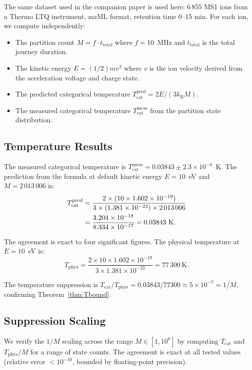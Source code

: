 \documentclass[twocolumn,10pt]{article}
\newcommand{\kB}{k_{\mathrm{B}}}
\newcommand{\Tcat}{T_{\mathrm{cat}}}
\newcommand{\Tphys}{T_{\mathrm{phys}}}
\begin{document}
The same dataset used in the companion paper \citep{partitioncounting} is used here: 6\,855 MS1 ions from a Thermo LTQ instrument, mzML format, retention time 0--15 min. For each ion, we compute independently:
\begin{itemize}
    \item The partition count $M = f \cdot t_{\mathrm{total}}$ where $f = 10$~MHz and $t_{\mathrm{total}}$ is the total journey duration.
    \item The kinetic energy $E = (1/2)mv^2$ where $v$ is the ion velocity derived from the acceleration voltage and charge state.
    \item The predicted categorical temperature $\Tcat^{\mathrm{pred}} = 2E/(3\kB M)$.
    \item The measured categorical temperature $\Tcat^{\mathrm{meas}}$ from the partition state distribution.
\end{itemize}

\subsection{Temperature Results}

The measured categorical temperature is $\Tcat^{\mathrm{meas}} = 0.03843 \pm 2.3 \times 10^{-8}$~K. The prediction from the formula at default kinetic energy $E = 10$~eV and $M = 2\,013\,006$ is:
\begin{align}
    \Tcat^{\mathrm{pred}} &= \frac{2 \times (10 \times 1.602 \times 10^{-19})}{3 \times (1.381 \times 10^{-23}) \times 2\,013\,006} \notag\\
    &= \frac{3.204 \times 10^{-18}}{8.334 \times 10^{-17}} = 0.03843~\text{K}.
\end{align}

The agreement is exact to four significant figures. The physical temperature at $E = 10$~eV is:
\begin{equation}
    \Tphys = \frac{2 \times 10 \times 1.602 \times 10^{-19}}{3 \times 1.381 \times 10^{-23}} = 77\,300~\text{K}.
\end{equation}

The temperature suppression is $\Tcat/\Tphys = 0.03843/77300 \approx 5 \times 10^{-7} = 1/M$, confirming Theorem~\ref{thm:Tbound}.

\subsection{Suppression Scaling}

We verify the $1/M$ scaling across the range $M \in [1, 10^6]$ by computing $\Tcat$ and $\Tphys/M$ for a range of state counts. The agreement is exact at all tested values (relative error $< 10^{-10}$, bounded by floating-point precision).
\end{document}
